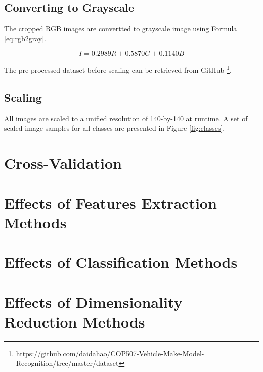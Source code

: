 \subsection{Converting to Grayscale}
The cropped RGB images are convertted to grayscale image using Formula \ref{eq:rgb2gray}.

\begin{equation}
\label{eq:rgb2gray}
I = 0.2989 R + 0.5870 G + 0.1140 B
\end{equation}

The pre-processed dataset before scaling can be retrieved from GitHub \footnote{https://github.com/daidahao/COP507-Vehicle-Make-Model-Recognition/tree/master/dataset}.

\subsection{Scaling}
All images are scaled to a unified resolution of 140-by-140 at runtime.
A set of scaled image samples for all classes are presented in Figure \ref{fig:classes}.

\section{Cross-Validation}


\section{Effects of Features Extraction Methods}
\label{sec:effects-fe}

\section{Effects of Classification Methods}
\label{sec:effects-cls}

\section{Effects of Dimensionality Reduction Methods}
\label{sec:effects-dim}

